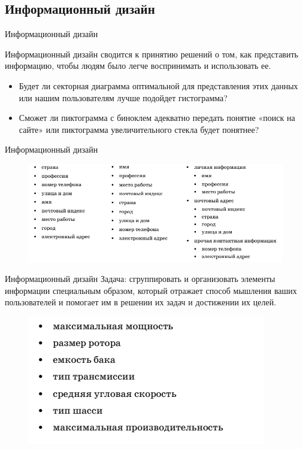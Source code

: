\documentclass{beamer}
\begin{document}
\subsection{Информационный дизайн}
\begin{frame}[t]{Информационный дизайн}
\begin{block}{Информационный дизайн}
сводится к принятию решений о том, как представить информацию, чтобы людям было легче воспринимать и использовать ее.
\end{block}
\begin{itemize}
\item Будет ли секторная диаграмма оптимальной для представления этих данных или нашим пользователям лучше подойдет гистограмма?
\item Сможет ли пиктограмма с биноклем адекватно передать понятие «поиск на сайте»
или пиктограмма увеличительного стекла будет понятнее?
\end{itemize} 
\end{frame}

\begin{frame}[t]{Информационный дизайн}
\begin{figure}[h]
\centering
\includegraphics[scale=0.6]{images/lec04-pic19.png}
\end{figure}
\end{frame}

\begin{frame}[t]{Информационный дизайн}
Задача: сгруппировать и организовать элементы информации специальным образом, который отражает способ мышления ваших пользователей и помогает им в решении их задач и достижении их целей.
\begin{figure}[h]
\centering
\includegraphics[scale=0.6]{images/lec04-pic20.png}
\end{figure}
\end{frame}
\end{document}
